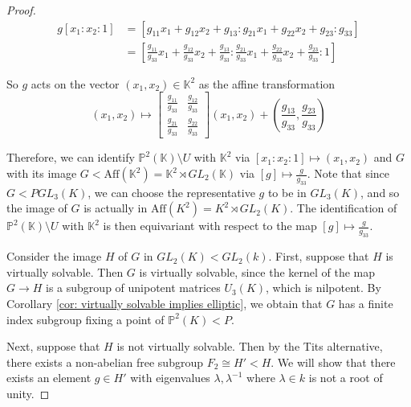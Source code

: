 \documentclass[12pt]{article}
\theoremstyle{definition}
\newcommand{\K}{\mathbb{K}}
\begin{document}
\begin{proof}
    \begin{align*}
        g[x_1:x_2:1] &= [g_{11} x_1 + g_{12}x_2 + g_{13}:g_{21} x_1 + g_{22}x_2 + g_{23}:g_{33}] \\
        &= [\frac{g_{11}}{g_{33}}x_1 + \frac{g_{12}}{g_{33}}x_2 + \frac{g_{13}}{g_{33}}:\frac{g_{21}}{g_{33}} x_1 + \frac{g_{22}}{g_{33}}x_2 + \frac{g_{23}}{g_{33}}:1]
    \end{align*}

    So $g$ acts on the vector $(x_1, x_2) \in \K^2$ as the affine transformation $$(x_1, x_2) \mapsto \begin{bmatrix}
        \frac{g_{11}}{g_{33}} & \frac{g_{12}}{g_{33}} \\
        \frac{g_{21}}{g_{33}} & \frac{g_{22}}{g_{33}}
    \end{bmatrix}(x_1, x_2) + (\frac{g_{13}}{g_{33}}, \frac{g_{23}}{g_{33}})$$

    Therefore, we can identify $\mathbb{P}^2(\K) \setminus U$ with $\K^2$ via $[x_1:x_2:1] \mapsto (x_1, x_2)$ and $G$ with its image $G < \mathrm{Aff}(\K^2) = \K^2 \rtimes GL_2(\K)$ via $[g] \mapsto \frac{g}{g_{33}}$. Note that since $G < PGL_3(K)$, we can choose the representative $g$ to be in $GL_3(K)$, and so the image of $G$ is actually in $\mathrm{Aff}(K^2) = K^2 \rtimes GL_2(K)$. The identification of $\mathbb{P}^2(\K) \setminus U$ with $\K^2$ is then equivariant with respect to the map $[g] \mapsto \frac{g}{g_{33}}$. 

    Consider the image $H$ of $G$ in $GL_2(K) < GL_2(k)$. First, suppose that $H$ is virtually solvable. Then $G$ is virtually solvable, since the kernel of the map $G \to H$ is a subgroup of unipotent matrices $U_3(K)$, which is nilpotent. By Corollary \ref{cor: virtually solvable implies elliptic}, we obtain that $G$ has a finite index subgroup fixing a point of $\mathbb{P}^2(K) < P$.

    Next, suppose that $H$ is not virtually solvable. Then by the Tits alternative, there exists a non-abelian free subgroup $F_2 \cong H' < H$.  We will show that there exists an element $g \in H'$ with eigenvalues $\lambda, \lambda^{-1}$ where $\lambda \in k$ is not a root of unity. 


\end{proof}
\end{document}
